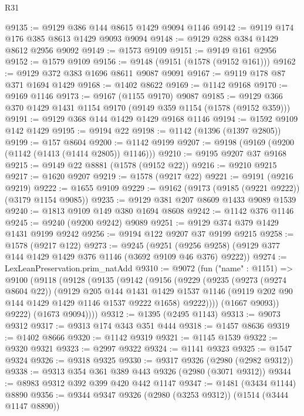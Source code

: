 \begin{lexlean}{R31}
\begin{coremodule}
@9135 := @9129 @386 @144 @8615 @1429 @9094 @1146
@9142 := @9119 @174 @176 @385 @8613 @1429 @9093 @9094
@9148 := @9129 @288 @384 @1429 @8612 @2956 @9092
@9149 := @1573 @9109
@9151 := @9149 @161 @2956
@9152 := @1579 @9109
@9156 := @9148 (@9151 (@1578 (@9152 @161)))
@9162 := @9129 @372 @383 @1696 @8611 @9087 @9091
@9167 := @9119 @178 @87 @371 @1694 @1429
@9168 := @1402 @8622
@9169 := @1142 @9168
@9170 := @9169 @1146
@9173 := @9167 (@1155 @9170) @9087
@9185 := @9129 @366 @370 @1429 @1431 @1154 @9170 (@9149 @359 @1154 (@1578 (@9152 @359)))
@9191 := @9129 @368 @144 @1429 @1429 @9168 @1146
@9194 := @1592 @9109 @142 @1429
@9195 := @9194 @22
@9198 := @1142 (@1396 (@1397 @2805))
@9199 := @157 @8604
@9200 := @1142 @9199
@9207 := @9198 (@9169 (@9200 (@1142 (@1413 (@1414 @2805)) @1146)))
@9210 := @9195 @9207 @37 @9168
@9215 := @9149 @22 @8881 (@1578 (@9152 @22))
@9216 := @9210 @9215
@9217 := @1620 @9207
@9219 := @1578 (@9217 @22)
@9221 := @9191 (@9216 @9219)
@9222 := @1655 @9109
@9229 := @9162 (@9173 (@9185 (@9221 @9222)) (@3179 @1154 @9085))
@9235 := @9129 @381 @207 @8609 @1433 @9089 @1539
@9240 := @1813 @9109 @149 @380 @1694 @8608
@9242 := @1142 @376 @1146
@9245 := @9240 (@9200 @9242) @9089
@9251 := @9129 @374 @379 @1429 @1431 @9199 @9242
@9256 := @9194 @122 @9207 @37 @9199 @9215
@9258 := @1578 (@9217 @122)
@9273 := @9245
    (@9251 (@9256 @9258) (@9129 @377 @144 @1429 @1429 @376 @1146 (@3692 @9109 @46 @376) @9222))
@9274 := LexLeanPreservation.prim_natAdd
@9310 := @9072
    (fun ("name" : @1151) =>
    @9100
      (@9118
        (@9128
          (@9135
            (@9142
              (@9156
                (@9229
                  (@9235
                    (@9273 (@9274 @8604 @22))
                    (@9129
                      @205
                      @144
                      @1431
                      @1429
                      @1537
                      @1146
                      (@9119 @202 @90 @144 @1429 @1429 @1146 @1537 @9222 @1658)
                      @9222))))
              (@1667 @9093))
            @9222)
          (@1673 @9094))))
@9312 := @1395 (@2495 @1143)
@9313 := @9073 @9312
@9317 := @9313 @174 @343 @351 @444
@9318 := @1457 @8636
@9319 := @1402 @8666
@9320 := @1142 @9319
@9321 := @1145 @1539
@9322 := @9320 @9321
@9323 := @2997 @9322
@9324 := @1141 @9323
@9325 := @1547 @9324
@9326 := @9318 @9325
@9330 := @9317 @9326 (@2980 (@2982 @9312))
@9338 := @9313 @354 @361 @389 @443 @9326 (@2980 (@3071 @9312))
@9344 := @8983 @9312 @392 @399 @420 @442 @1147
@9347 := @1481 (@3434 @1144) @8890
@9356 := @9344 @9347 @9326 (@2980 (@3253 @9312)) (@1514 (@3444 @1147 @8890))

\end{coremodule}
\end{lexlean}
